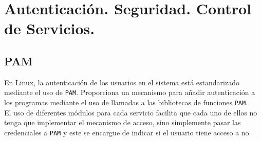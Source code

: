 \documentclass[10pt]{article}
\begin{document}
	\section{Autenticación. Seguridad. Control de Servicios.}
	\subsection{PAM}
	En Linux, la autenticación de los usuarios en el sistema está estandarizado mediante el uso de \verb|PAM|. Proporciona un mecanismo para añadir autenticación a los programas mediante el uso de llamadas a las bibliotecas de funciones \verb|PAM|.\\
	El uso de diferentes módulos para cada servicio facilita que cada uno de ellos no tenga que implementar el mecanismo de acceso, sino simplemente pasar las credenciales a \verb|PAM| y este se encargue de indicar si el usuario tiene acceso a no.
	
\end{document}
